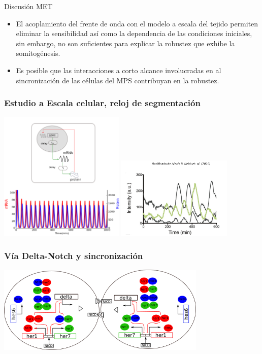 \documentclass[xcolor=table, xllnames]{beamer}
\begin{document}
\begin{frame}{Discusión MET}
	
	\begin{itemize}
		\item El acoplamiento del frente de onda con el modelo a escala del tejido permiten eliminar la sensibilidad así como la dependencia de las condiciones iniciales, sin embargo, no son suficientes para explicar la robustez que exhibe la somitogénesis.
		\item Es posible que las interacciones a corto alcance involucradas en al sincronización de las células del MPS contribuyan en la robustez.
		
	\end{itemize}
\end{frame}


\begin{frame}
	\frametitle{Estudio a Escala celular, reloj de segmentaci\'on}
	\centering 
	\includegraphics[width=6cm]{Figuras/reloj.pdf} %
	\pause
	\includegraphics[width=5.5cm]{Figuras/oscilacionEsto.pdf}
\end{frame}

\begin{frame}
	\frametitle{Vía Delta-Notch y sincronizaci\'on}
	\centering
	\includegraphics[width=10cm]{Figuras/interactions3.png}
\end{frame}
\end{document}
